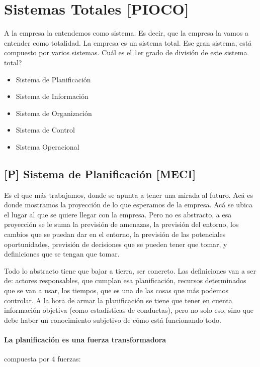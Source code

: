 \hypertarget{sistemas-totales-pioco}{%
\section{Sistemas Totales {[}PIOCO{]}}\label{sistemas-totales-pioco}}

A la empresa la entendemos como sistema. Es decir, que la empresa la
vamos a entender como totalidad. La empresa es un sistema total. Ese
gran sistema, está compuesto por varios sistemas. Cuál es el 1er grado
de división de este sistema total?

\begin{itemize}
  \setlength\itemsep{-1em}
\item
  Sistema de Planificación
\item
  Sistema de Información
\item
  Sistema de Organización
\item
  Sistema de Control
\item
  Sistema Operacional
\end{itemize}

\hypertarget{sistema-de-planificaciuxf3n-meci}{%
\subsection{{[}P{]} Sistema de Planificación
{[}MECI{]}}\label{sistema-de-planificaciuxf3n-meci}}

Es el que más trabajamos, donde se apunta a tener una mirada al futuro.
Acá es donde mostramos la proyección de lo que esperamos de la empresa.
Acá se ubica el lugar al que se quiere llegar con la empresa. Pero no es
abstracto, a esa proyección se le suma la previsión de amenazas, la
previsión del entorno, los cambios que se puedan dar en el entorno, la
previsión de las potenciales oportunidades, previsión de decisiones que
se pueden tener que tomar, y definiciones que se tengan que tomar.

Todo lo abstracto tiene que bajar a tierra, ser concreto. Las
definiciones van a ser de: actores responsables, que cumplan esa
planificación, recursos determinados que se van a usar, los tiempos, que
es una de las cosas que más podemos controlar.
%
A la hora de armar la planificación se tiene que tener en cuenta
información objetiva (como estadísticas de conductas), pero no solo eso,
sino que debe haber un conocimiento subjetivo de cómo está funcionando
todo.
%
\paragraph{La planificación es una fuerza transformadora}
compuesta por 4 fuerzas:

